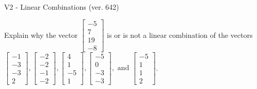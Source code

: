 \begin{exercise}
  \begin{exerciseTitle}V2 - Linear Combinations (ver. 642)\end{exerciseTitle}
  \begin{exerciseStatement}
    Explain why the vector \(\left[\begin{array}{c}
-5 \\
7 \\
19 \\
-8
\end{array}\right]\)  is or is not a linear 
	combination of the vectors \(\left[\begin{array}{c}
-1 \\
-3 \\
-3 \\
2
\end{array}\right] , \left[\begin{array}{c}
-2 \\
-2 \\
-1 \\
-2
\end{array}\right] , \left[\begin{array}{c}
4 \\
1 \\
-5 \\
1
\end{array}\right] , \left[\begin{array}{c}
-5 \\
0 \\
-3 \\
-3
\end{array}\right] , \text{ and } \left[\begin{array}{c}
-5 \\
1 \\
1 \\
2
\end{array}\right]\).
	



\end{exerciseStatement}
\end{exercise}
